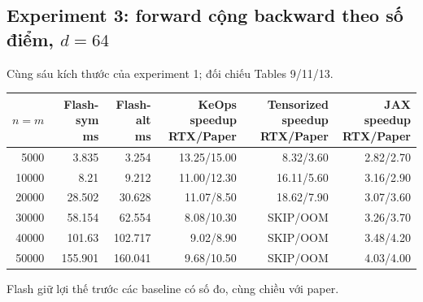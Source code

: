 \documentclass[11pt,a4paper]{article}
\newcommand{\SKIP}{\textnormal{SKIP}}
\begin{document}
\subsection{Experiment 3: forward cộng backward theo số điểm, $d=64$}
Cùng sáu kích thước của experiment 1; đối chiếu Tables 9/11/13.
\begin{center}\footnotesize
\setlength{\tabcolsep}{5pt}
\begin{tabular}{@{}rrrrrr@{}}
\toprule
$n=m$ & \shortstack{Flash-sym\\ms} & \shortstack{Flash-alt\\ms} & \shortstack{KeOps speedup\\RTX/Paper} & \shortstack{Tensorized speedup\\RTX/Paper} & \shortstack{JAX speedup\\RTX/Paper} \\
\midrule
5000 & 3.835 & 3.254 & 13.25/15.00 & 8.32/3.60 & 2.82/2.70 \\
10000 & 8.21 & 9.212 & 11.00/12.30 & 16.11/5.60 & 3.16/2.90 \\
20000 & 28.502 & 30.628 & 11.07/8.50 & 18.62/7.90 & 3.07/3.60 \\
30000 & 58.154 & 62.554 & 8.08/10.30 & \SKIP/OOM & 3.26/3.70 \\
40000 & 101.63 & 102.717 & 9.02/8.90 & \SKIP/OOM & 3.48/4.20 \\
50000 & 155.901 & 160.041 & 9.68/10.50 & \SKIP/OOM & 4.03/4.00 \\
\bottomrule
\end{tabular}
\end{center}
Flash giữ lợi thế trước các baseline có số đo, cùng chiều với paper.
\end{document}
